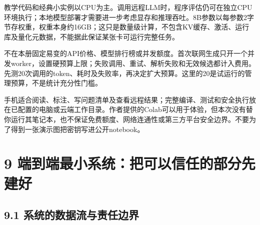 教学代码和经典小实例以CPU为主。调用远程LLM时，程序评估仍可在独立CPU环境执行；本地模型部署才需要进一步考虑显存和推理吞吐。8B参数以每参数2字节存权重，权重本身约16GB；这只是数量级计算，不包含KV缓存、激活、运行库及量化元数据，不能据此保证某张卡可运行完整任务。

不在本册固定易变的API价格、模型排行榜或并发额度。首次联网生成只开一个并发worker，设置硬预算上限；失败调用、重试、解析失败和无效候选都计入费用。先测20次调用的token、耗时及失败率，再决定扩大预算。这里的20是试运行的管理预算，不是统计充分性门槛。

手机适合阅读、标注、写问题清单及查看远程结果；完整编译、测试和安全执行放在已配置的电脑或云端工作目录。作者提供的Colab可以用于体验，但本次没有替你运行其笔记本，也不保证免费额度、网络连通性或第三方平台安全边界。不要为了得到一张演示图把密钥写进公开notebook。

\section{9
端到端最小系统：把可以信任的部分先建好}\label{ux7aefux5230ux7aefux6700ux5c0fux7cfbux7edfux628aux53efux4ee5ux4fe1ux4efbux7684ux90e8ux5206ux5148ux5efaux597d}

\subsection{9.1
系统的数据流与责任边界}\label{ux7cfbux7edfux7684ux6570ux636eux6d41ux4e0eux8d23ux4efbux8fb9ux754c}

